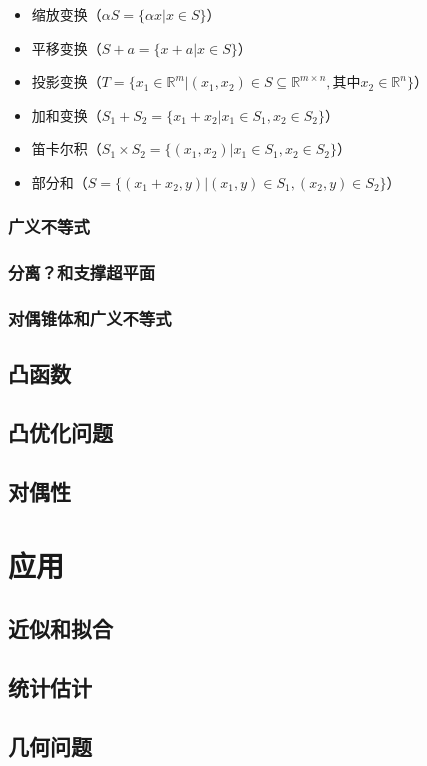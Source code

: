 \documentclass[12pt,a4paper]{book}
\begin{document}
\begin{itemize}
    \item 缩放变换（$\alpha S = \{\alpha x | x\in S\}$）
    \item 平移变换（$ S + a = \{x+a | x\in S\}$）
    \item 投影变换（$T=\{x_1\in\mathbb{R}^m | (x_1,x_2)\in S \subseteq \mathbb{R}^{m\times n},\text{其中}x_2\in \mathbb{R}^n\}$）
    \item 加和变换（$S_1+S_2= \{x_1+x_2 | x_1\in S_1,x_2\in S_2\}$）
    \item 笛卡尔积（$S_1 \times S_2= \{(x_1,x_2) | x_1\in S_1,x_2\in S_2\}$）
    \item 部分和（$S= \{(x_1+x_2,y )| (x_1,y)\in S_1,(x_2,y)\in S_2\}$）
\end{itemize}



\section{广义不等式}
\section{分离？和支撑超平面}
\section{对偶锥体和广义不等式}

\chapter{凸函数}
\chapter{凸优化问题}
\chapter{对偶性}

\part{应用}
\chapter{近似和拟合}
\chapter{统计估计}
\chapter{几何问题}




\printindex
\end{document}

